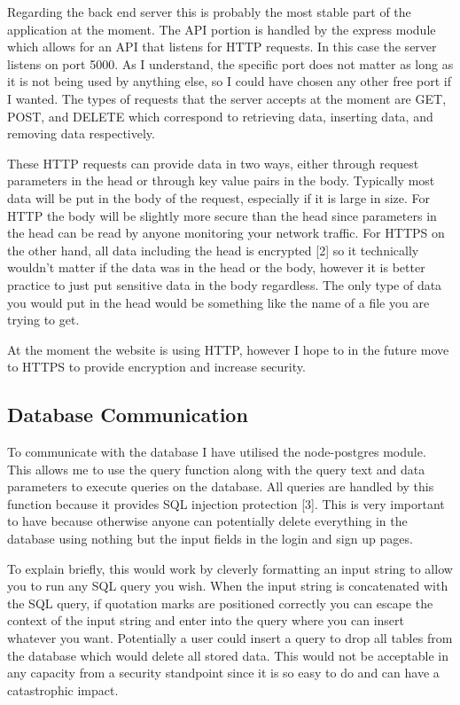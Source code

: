 \documentclass[]{final_report}
\begin{document}
Regarding the back end server this is probably the most stable part of the application at the moment. The API portion is handled by the express module which allows for an API that listens for HTTP requests. In this case the server listens on port 5000. As I understand, the specific port does not matter as long as it is not being used by anything else, so I could have chosen any other free port if I wanted. The types of requests that the server accepts at the moment are GET, POST, and DELETE which correspond to retrieving data, inserting data, and removing data respectively. 

These HTTP requests can provide data in two ways, either through request parameters in the head or through key value pairs in the body. Typically most data will be put in the body of the request, especially if it is large in size. For HTTP the body will be slightly more secure than the head since parameters in the head can be read by anyone monitoring your network traffic. For HTTPS on the other hand, all data including the head is encrypted [2] so it technically wouldn't matter if the data was in the head or the body, however it is better practice to just put sensitive data in the body regardless. The only type of data you would put in the head would be something like the name of a file you are trying to get. 

At the moment the website is using HTTP, however I hope to in the future move to HTTPS to provide encryption and increase security.

\newpage
\subsection{Database Communication}

To communicate with the database I have utilised the node-postgres module. This allows me to use the query function along with the query text and data parameters to execute queries on the database. All queries are handled by this function because it provides SQL injection protection [3]. This is very important to have because otherwise anyone can potentially delete everything in the database using nothing but the input fields in the login and sign up pages. 

To explain briefly, this would work by cleverly formatting an input string to allow you to run any SQL query you wish. When the input string is concatenated with the SQL query, if quotation marks are positioned correctly you can escape the context of the input string and enter into the query where you can insert whatever you want. Potentially a user could insert a query to drop all tables from the database which would delete all stored data. This would not be acceptable in any capacity from a security standpoint since it is so easy to do and can have a catastrophic impact.
\end{document}
